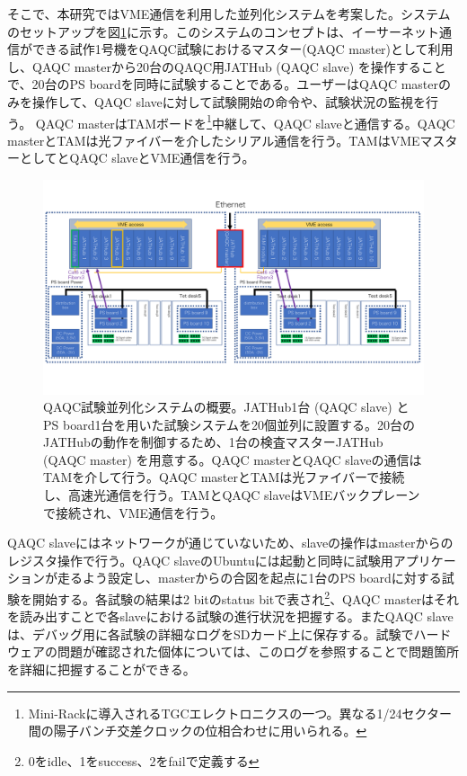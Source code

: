そこで、本研究ではVME通信を利用した並列化システムを考案した。システムのセットアップを図\ref{QAQCpararell}に示す。このシステムのコンセプトは、イーサーネット通信ができる試作1号機をQAQC試験におけるマスター(QAQC master)として利用し、QAQC masterから20台のQAQC用JATHub (QAQC slave) を操作することで、20台のPS boardを同時に試験することである。ユーザーはQAQC masterのみを操作して、QAQC slaveに対して試験開始の命令や、試験状況の監視を行う。
QAQC masterはTAMボードを\footnote{Mini-Rackに導入されるTGCエレクトロニクスの一つ。異なる1/24セクター間の陽子バンチ交差クロックの位相合わせに用いられる。}中継して、QAQC slaveと通信する。QAQC masterとTAMは光ファイバーを介したシリアル通信を行う。TAMはVMEマスターとしてとQAQC slaveとVME通信を行う。

\begin{figure} 
    \centering
    \includegraphics[width=16cm]{fig/QAQC/QAQCpararell.pdf}
    \caption[並列化システムの概要]{QAQC試験並列化システムの概要。JATHub1台 (QAQC slave) とPS board1台を用いた試験システムを20個並列に設置する。20台のJATHubの動作を制御するため、1台の検査マスターJATHub (QAQC master) を用意する。QAQC masterとQAQC slaveの通信はTAMを介して行う。QAQC masterとTAMは光ファイバーで接続し、高速光通信を行う。TAMとQAQC slaveはVMEバックプレーンで接続され、VME通信を行う。}
    \label{QAQCpararell}
\end{figure}

QAQC slaveにはネットワークが通じていないため、slaveの操作はmasterからのレジスタ操作で行う。QAQC slaveのUbuntuには起動と同時に試験用アプリケーションが走るよう設定し、masterからの合図を起点に1台のPS boardに対する試験を開始する。各試験の結果は2 bitのstatus bitで表され\footnote{0をidle、1をsuccess、2をfailで定義する}、QAQC masterはそれを読み出すことで各slaveにおける試験の進行状況を把握する。またQAQC slaveは、デバッグ用に各試験の詳細なログをSDカード上に保存する。試験でハードウェアの問題が確認された個体については、このログを参照することで問題箇所を詳細に把握することができる。


